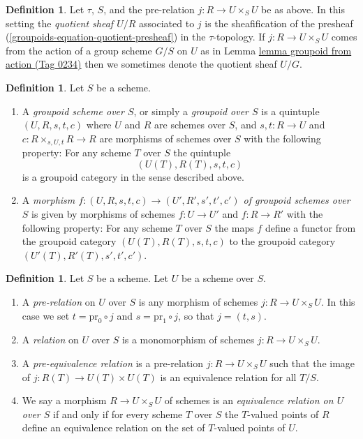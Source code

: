 \documentclass{amsart}
\theoremstyle{plain}
\theoremstyle{definition}
\newtheorem{definition}[subsection]{Definition}
\theoremstyle{remark}
\numberwithin{equation}{subsection}
\begin{document}
\begin{definition}
\label{groupoids-definition-quotient-sheaf}
Let $\tau$, $S$, and the pre-relation $j : R \to U \times_S U$ be as above.
In this setting the {\it quotient sheaf $U/R$} associated
to $j$ is the sheafification of the presheaf
(\ref{groupoids-equation-quotient-presheaf}) in the $\tau$-topology.
If $j : R \to U \times_S U$ comes from the action of a group scheme
$G/S$ on $U$ as in Lemma \href{https://stacks.math.columbia.edu/tag/0234}{lemma groupoid from action (Tag 0234)} then we
sometimes denote the quotient sheaf $U/G$.
\end{definition}

\begin{definition}
\label{groupoids-definition-groupoid}
Let $S$ be a scheme.
\begin{enumerate}
\item A {\it groupoid scheme over $S$}, or simply a
{\it groupoid over $S$} is a
quintuple $(U, R, s, t, c)$ where
$U$ and $R$ are schemes over $S$, and
$s, t : R \to U$ and $c : R \times_{s, U, t} R \to R$
are morphisms of schemes over $S$ with the
following property: For any scheme
$T$ over $S$ the quintuple
$$
(U(T), R(T), s, t, c)
$$
is a groupoid category in the sense described above.
\item A {\it morphism
$f : (U, R, s, t, c) \to (U', R', s', t', c')$
of groupoid schemes over $S$} is given by morphisms
of schemes $f : U \to U'$ and $f : R \to R'$ with the
following property:  For any scheme
$T$ over $S$ the maps $f$ define a functor from the
groupoid category $(U(T), R(T), s, t, c)$ to the
groupoid category $(U'(T), R'(T), s', t', c')$.
\end{enumerate}
\end{definition}

\begin{definition}
\label{groupoids-definition-equivalence-relation}
Let $S$ be a scheme. Let $U$ be a scheme over $S$.
\begin{enumerate}
\item A {\it pre-relation} on $U$ over $S$ is any morphism
of schemes $j : R \to U \times_S U$. In this case we set
$t = \text{pr}_0 \circ j$ and $s = \text{pr}_1 \circ j$, so
that $j = (t, s)$.
\item A {\it relation} on $U$ over $S$ is a monomorphism
of schemes $j : R \to U \times_S U$.
\item A {\it pre-equivalence relation} is a pre-relation
$j : R \to U \times_S U$ such that the image of
$j : R(T) \to U(T) \times U(T)$ is an equivalence relation for
all $T/S$.
\item We say a morphism $R \to U \times_S U$ of schemes is
an {\it equivalence relation on $U$ over $S$}
if and only if for every scheme $T$ over $S$ the $T$-valued
points of $R$ define an equivalence relation
on the set of $T$-valued points of $U$.
\end{enumerate}
\end{definition}
\end{document}
